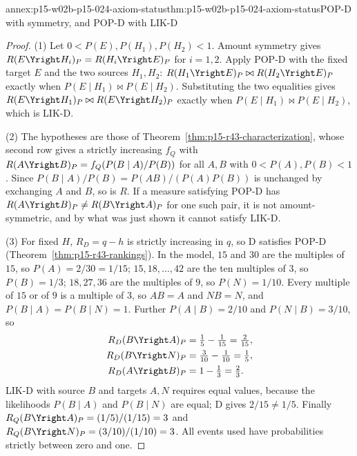 \begin{annexitem}{annex:p15-w02b-p15-024-axiom-status}{thm:p15-w02b-p15-024-axiom-status}{POP-D with symmetry, and POP-D with LIK-D}
\begin{proof}
(1) Let \(0<P(E),P(H_1),P(H_2)<1\). Amount symmetry gives
\(R(E\Yright H_i)_P=R(H_i\Yright E)_P\) for \(i=1,2\). Apply POP-D
with the fixed target \(E\) and the two sources \(H_1,H_2\):
\(R(H_1\Yright E)_P\bowtie R(H_2\Yright E)_P\) exactly when
\(P(E\mid H_1)\bowtie P(E\mid H_2)\). Substituting the two equalities
gives \(R(E\Yright H_1)_P\bowtie R(E\Yright H_2)_P\) exactly when
\(P(E\mid H_1)\bowtie P(E\mid H_2)\), which is LIK-D.

(2) The hypotheses are those of
Theorem~\ref{thm:p15-r43-characterization}, whose second row gives a
strictly increasing \(f_Q\) with \(R(A\Yright B)_P=f_Q(P(B\mid A)/P(B))\)
for all \(A,B\) with \(0<P(A),P(B)<1\). Since
\(P(B\mid A)/P(B)=P(AB)/(P(A)P(B))\) is unchanged by exchanging \(A\)
and \(B\), so is \(R\). If a measure satisfying POP-D has
\(R(A\Yright B)_P\neq R(B\Yright A)_P\) for one such pair, it is not
amount-symmetric, and by what was just shown it cannot satisfy LIK-D.

(3) For fixed \(H\), \(R_D=q-h\) is strictly increasing in \(q\), so D
satisfies POP-D (Theorem~\ref{thm:p15-r43-rankings}). In the model,
\(15\) and \(30\) are the multiples of \(15\), so \(P(A)=2/30=1/15\);
\(15,18,\ldots,42\) are the ten multiples of \(3\), so \(P(B)=1/3\);
\(18,27,36\) are the multiples of \(9\), so \(P(N)=1/10\). Every
multiple of \(15\) or of \(9\) is a multiple of \(3\), so \(AB=A\) and
\(NB=N\), and \(P(B\mid A)=P(B\mid N)=1\). Further
\(P(A\mid B)=2/10\) and \(P(N\mid B)=3/10\), so
\[
 \begin{aligned}
 R_D(B\Yright A)_P&=\tfrac15-\tfrac1{15}=\tfrac2{15},\\
 R_D(B\Yright N)_P&=\tfrac3{10}-\tfrac1{10}=\tfrac15,\\
 R_D(A\Yright B)_P&=1-\tfrac13=\tfrac23 .
 \end{aligned}
\]
LIK-D with source \(B\) and targets \(A,N\) requires equal values,
because the likelihoods \(P(B\mid A)\) and \(P(B\mid N)\) are equal;
D gives \(2/15\neq1/5\). Finally
\(R_Q(B\Yright A)_P=(1/5)/(1/15)=3\) and
\(R_Q(B\Yright N)_P=(3/10)/(1/10)=3\). All events used have
probabilities strictly between zero and one.
\end{proof}
\end{annexitem}

